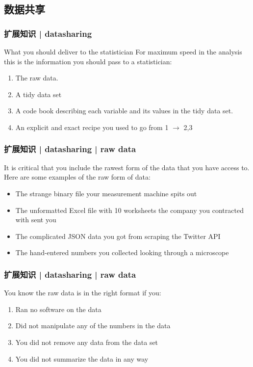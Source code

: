 \subsection{数据共享}
\begin{frame}
  \frametitle{扩展知识 | datasharing}
  \begin{block}{What you should deliver to the statistician}
    For maximum speed in the analysis this is the information you should pass to a statistician:
    \begin{enumerate}
      \item The raw data.
      \item A tidy data set
      \item A code book describing each variable and its values in the tidy data set.
      \item An explicit and exact recipe you used to go from 1 $\rightarrow$ 2,3
    \end{enumerate}
  \end{block}
\end{frame}

\begin{frame}
  \frametitle{扩展知识 | datasharing | raw data}
  It is critical that you include the rawest form of the data that you have access to. Here are some examples of the raw form of data:
  \begin{itemize}
    \item The strange binary file your measurement machine spits out
    \item The unformatted Excel file with 10 worksheets the company you contracted with sent you
    \item The complicated JSON data you got from scraping the Twitter API
    \item The hand-entered numbers you collected looking through a microscope
  \end{itemize}
\end{frame}

\begin{frame}
  \frametitle{扩展知识 | datasharing | raw data}
  You know the raw data is in the right format if you:
  \begin{enumerate}
    \item Ran no software on the data
    \item Did not manipulate any of the numbers in the data
    \item You did not remove any data from the data set
    \item You did not summarize the data in any way
  \end{enumerate}
\end{frame}

